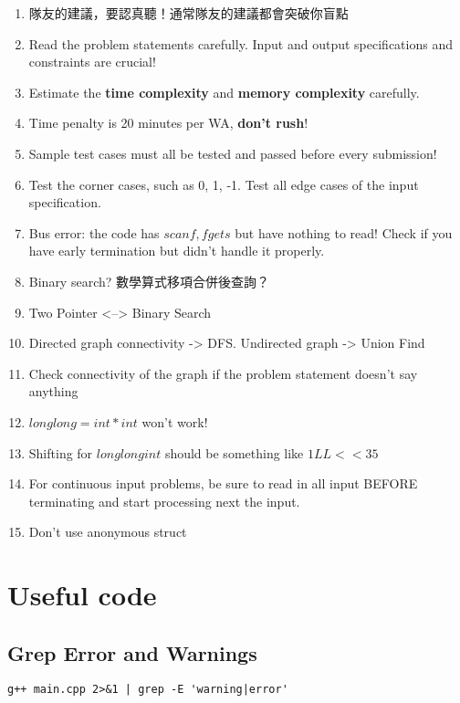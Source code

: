 \documentclass[10pt,oneside]{article}
\begin{document}
\begin{landscape}
\begin{multicols}{2}
\begin{enumerate}
	\item 隊友的建議，要認真聽！通常隊友的建議都會突破你盲點
	\item Read the problem statements carefully. Input and output specifications and constraints are crucial!
	\item Estimate the \textbf{time complexity} and \textbf{memory complexity} carefully.
	\item Time penalty is 20 minutes per WA, \textbf{don't rush}!
	\item Sample test cases must all be tested and passed before every submission!
	\item Test the corner cases, such as 0, 1, -1. Test all edge cases of the input specification.
	\item Bus error: the code has $scanf, fgets$ but have nothing to read! Check if you have early termination but didn't handle it properly.
	\item Binary search? 數學算式移項合併後查詢？
	\item Two Pointer <--> Binary Search
	\item Directed graph connectivity -> DFS. Undirected graph -> Union Find
	\item Check connectivity of the graph if the problem statement doesn't say anything
	\item $long long = int * int$ won't work!
	\item Shifting for $long long int$ should be something like $1LL << 35$
	\item For continuous input problems, be sure to read in all input BEFORE terminating and start processing next the input.
	\item Don't use anonymous struct
\end{enumerate}


\section{Useful code}

\subsection{Grep Error and Warnings}

\begin{lstlisting}
g++ main.cpp 2>&1 | grep -E 'warning|error'
\end{lstlisting}


\end{multicols}
\end{landscape}
\end{document}
